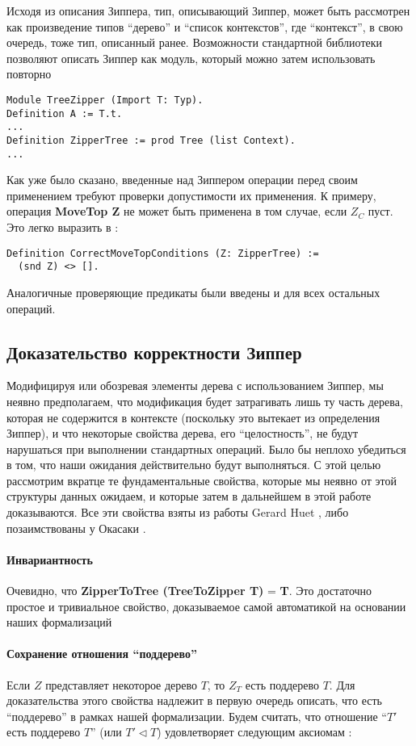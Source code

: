 Исходя из описания Зиппера, тип, описывающий Зиппер, может быть рассмотрен как произведение типов ``дерево'' и ``список контекстов'', где ``контекст'', в свою очередь, тоже тип, описанный ранее. Возможности стандартной библиотеки \tcoq~ позволяют описать Зиппер как модуль, который можно затем использовать повторно

\begin{lstlisting}
Module TreeZipper (Import T: Typ).
Definition A := T.t.
...
Definition ZipperTree := prod Tree (list Context).
...
\end{lstlisting}

Как уже было сказано, введенные над Зиппером операции перед своим применением требуют проверки допустимости их применения. К примеру, операция \textbf{MoveTop Z} не может быть применена в том случае, если $Z_C$ пуст. Это легко выразить в \tcoq:
\begin{lstlisting}
Definition CorrectMoveTopConditions (Z: ZipperTree) :=
  (snd Z) <> [].
\end{lstlisting}
Аналогичные проверяющие предикаты были введены и для всех остальных операций.

\subsection{Доказательство корректности Зиппер}

Модифицируя или обозревая элементы дерева с использованием Зиппер, мы неявно предполагаем, что модификация будет затрагивать лишь ту часть дерева, которая не содержится в контексте (поскольку это вытекает из определения Зиппер), и что некоторые свойства дерева, его ``целостность'', не будут нарушаться при выполнении стандартных операций. Было бы неплохо убедиться в том, что наши ожидания действительно будут выполняться. С этой целью рассмотрим вкратце те фундаментальные свойства, которые мы неявно от этой структуры данных ожидаем, и которые затем в дальнейшем в этой работе доказываются. Все эти свойства взяты из работы Gerard Huet \autocite{Huet1997}, либо позаимствованы у Окасаки \autocite{Okasaki1996}.

\paragraph{Инвариантность}
Очевидно, что \textbf{ZipperToTree (TreeToZipper T)} = \textbf{T}. Это достаточно простое и тривиальное свойство, доказываемое самой автоматикой \tcoq на основании наших формализаций

\paragraph{Сохранение отношения ``поддерево''}
Если $Z$ представляет некоторое дерево $T$, то $Z_T$ есть поддерево $T$. Для доказательства этого свойства надлежит в первую очередь описать, что есть ``поддерево'' в рамках нашей формализации. Будем считать, что отношение ``$T'$ есть поддерево $T$'' (или $T' \triangleleft T$) удовлетворяет следующим аксиомам \autocite{Okasaki1996}:

